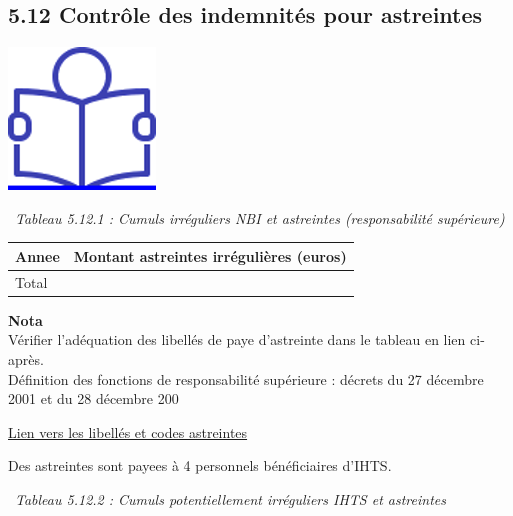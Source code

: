 \hypertarget{controle-des-indemnites-pour-astreintes}{%
\subsection{5.12 Contrôle des indemnités pour
astreintes}\label{controle-des-indemnites-pour-astreintes}}

\href{../Docs/Notices/fiche_astreintes.odt}{\includegraphics{icones/Notice.png}}

~\emph{Tableau 5.12.1 : Cumuls irréguliers NBI et astreintes
(responsabilité supérieure)}

\begin{longtable}[]{@{}ll@{}}
\toprule
Annee & Montant astreintes irrégulières (euros)\tabularnewline
\midrule
\endhead
Total &\tabularnewline
\bottomrule
\end{longtable}

\textbf{Nota}\\
Vérifier l'adéquation des libellés de paye d'astreinte dans le tableau
en lien ci-après.\\
Définition des fonctions de responsabilité supérieure : décrets du 27
décembre 2001 et du 28 décembre 200

\href{../Bases/Reglementation/libelles.astreintes.csv}{Lien vers les
libellés et codes astreintes}

Des astreintes sont payees à 4 personnels bénéficiaires d'IHTS.

~\emph{Tableau 5.12.2 : Cumuls potentiellement irréguliers IHTS et
astreintes}

